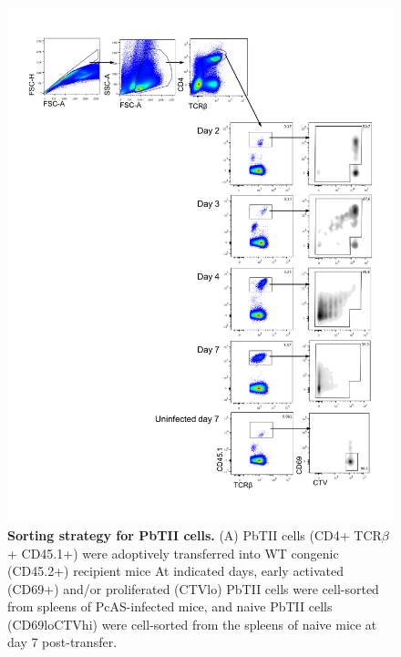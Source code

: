\begin{figure}
    \centering
    \includegraphics[width=\textwidth]{"Fig S2 rev3"}
    \caption[Sorting strategy for PbTII cells]{\textbf{Sorting strategy for PbTII cells.} (A) PbTII cells (CD4+ TCR\(\beta\)+ CD45.1+) were adoptively transferred into WT congenic (CD45.2+) recipient mice At indicated days, early activated (CD69+) and/or proliferated (CTVlo) PbTII cells were cell-sorted from spleens of PcAS-infected mice, and naive PbTII cells (CD69loCTVhi) were cell-sorted from the spleens of naive mice at day 7 post-transfer.}
    \label{fig:ms2}
\end{figure}

